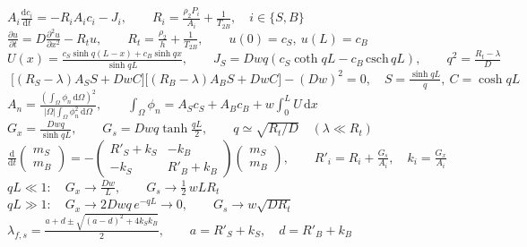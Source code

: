 \documentclass[border=3pt,multi=eqpage]{standalone}
\newenvironment{eqpage}{$\displaystyle}{$}
\begin{document}
\begin{eqpage}A_i\frac{\mathrm dc_i}{\mathrm dt}=-R_iA_ic_i-J_i,\qquad R_i=\frac{\rho_2P_i}{A_i}+\frac{1}{T_{2B}},\quad i\in\{S,B\}\end{eqpage}
\begin{eqpage}\frac{\partial u}{\partial t}=D\frac{\partial^2u}{\partial x^2}-R_tu,\qquad R_t=\frac{\rho_2}{h}+\frac{1}{T_{2B}},\qquad u(0)=c_S,\ u(L)=c_B\end{eqpage}
\begin{eqpage}U(x)=\frac{c_S\sinh q(L-x)+c_B\sinh qx}{\sinh qL},\qquad J_S=Dwq\left(c_S\coth qL-c_B\,\mathrm{csch}\,qL\right),\qquad q^2=\frac{R_t-\lambda}{D}\end{eqpage}
\begin{eqpage}\boxed{\;\big[(R_S-\lambda)A_SS+DwC\big]\big[(R_B-\lambda)A_BS+DwC\big]-(Dw)^2=0,\quad S=\frac{\sinh qL}{q},\ C=\cosh qL\;}\end{eqpage}
\begin{eqpage}A_n=\frac{\left(\int_\Omega\phi_n\,\mathrm d\Omega\right)^2}{|\Omega|\int_\Omega\phi_n^2\,\mathrm d\Omega},\qquad \int_\Omega\phi_n=A_Sc_S+A_Bc_B+w\int_0^LU\,\mathrm dx\end{eqpage}
\begin{eqpage}G_x=\frac{Dwq}{\sinh qL},\qquad G_s=Dwq\tanh\frac{qL}{2},\qquad q\simeq\sqrt{R_t/D}\quad(\lambda\ll R_t)\end{eqpage}
\begin{eqpage}\frac{\mathrm d}{\mathrm dt}\begin{pmatrix}m_S\\ m_B\end{pmatrix}=-\begin{pmatrix}R'_S+k_S&-k_B\\-k_S&R'_B+k_B\end{pmatrix}\begin{pmatrix}m_S\\ m_B\end{pmatrix},\qquad R'_i=R_i+\frac{G_s}{A_i},\quad k_i=\frac{G_x}{A_i}\end{eqpage}
\begin{eqpage}qL\ll1:\quad G_x\to\frac{Dw}{L},\qquad G_s\to\tfrac12\,wLR_t\end{eqpage}
\begin{eqpage}qL\gg1:\quad G_x\to2Dwq\,e^{-qL}\to0,\qquad G_s\to w\sqrt{DR_t}\end{eqpage}
\begin{eqpage}\lambda_{f,s}=\frac{a+d\pm\sqrt{(a-d)^2+4k_Sk_B}}{2},\qquad a=R'_S+k_S,\quad d=R'_B+k_B\end{eqpage}
\end{document}
